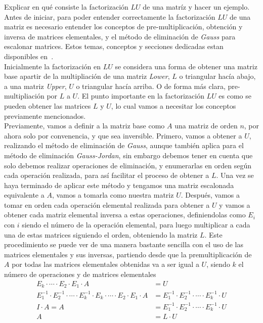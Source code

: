 \item Explicar en qué consiste la factorización \(LU\) de una matríz y hacer un ejemplo. \\
    Antes de iniciar, para poder entender correctamente la factorización \(LU\) de una matriz es necesario entender los conceptos de 
    pre-multiplicación, obtención y inversa de matrices elementales, y el método de eliminación de \emph{Gauss} para escalonar matrices.
    Estos temas, conceptos y secciones dedicadas estan disponibles en~\cite{martinez}. \\[0.25cm]
    Inicialmente la factorización en \(LU\) se considera una forma de obtener una matriz base apartir de la multipliación de una matriz \emph{Lower},
    \(L\) o triangular hacía abajo, a una matriz \emph{Upper}, \(U\) o triangular hacía arriba. O de forma más clara, pre-multipliación por \(L\) a \(U\).
    El punto importante en la factorización \(LU\) es como se pueden obtener las matrices \(L\) y \(U\), lo cual vamos a necesitar los conceptos previamente mencionados. 
    \\[0.25cm]
    Previamente, vamos a definir a la matriz base como \(A\) una matriz de orden \(n\), por ahora solo por convenencia, y que sea inversible.
    Primero, vamos a obtener a \(U\), realizando el método de eliminación de \emph{Gauss}, aunque también aplica para el método de eliminación \emph{Gauss-Jordan},
    sin embargo debemos tener en cuenta que solo debemos realizar operaciones de eliminación, y enumerarlas en orden según cada operación realizada, 
    para así facilitar el proceso de obtener a \(L\). Una vez se haya terminado de aplicar este método y tengamos una matriz escalonada equivalente a \(A\), 
    vamos a tomarla como nuestra matriz \(U\). Después, vamos a tomar en orden cada operación elemental realizada para obtener a \(U\) 
    y vamos a obtener cada matriz elemental inversa a estas operaciones, definiendolas como \(E_i\) con \(i\) siendo el número de la operación elemental,
    para luego multiplicar a cada una de estas matrices siguiendo el orden, obteniendo la matriz \(L\). 
    Este procedimiento se puede ver de una manera bastante sencilla con el uso de las matrices elementales y sus inversas,
    partiendo desde que la premultiplicación de \(A\) por todas las matrices elementales obtenidas va a ser igual a \(U\), 
    siendo \(k\) el número de operaciones y de matrices elementales
    \[
        \begin{aligned}
            E_k \cdot \cdots \cdot E_2 \cdot E_1 \cdot A &= U \\
            E^{-1}_1 \cdot E^{-1}_2 \cdot \cdots \cdot E^{-1}_k \cdot E_k \cdot \cdots \cdot E_2 \cdot E_1 \cdot A &= E^{-1}_1 \cdot E^{-1}_2 \cdot \cdots \cdot E^{-1}_k \cdot U \\
            I \cdot A = A &= E^{-1}_1 \cdot E^{-1}_2 \cdot \cdots \cdot E^{-1}_k \cdot U \\
            A &= L \cdot U \\
        \end{aligned}
    \]
